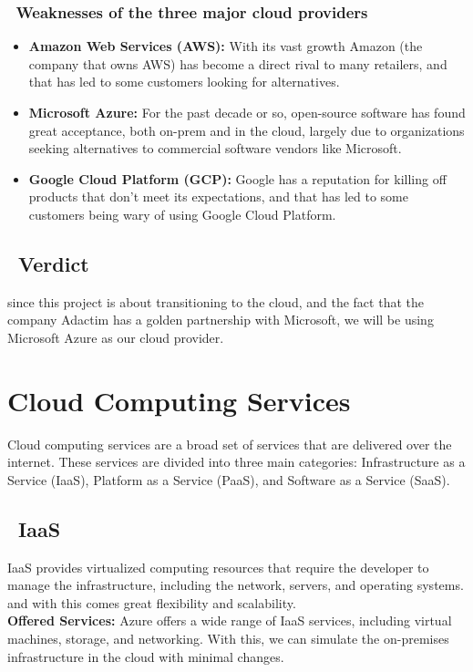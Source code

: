 \subsubsection*{ \textbullet\ Weaknesses of the three major cloud providers \cite{webArticle1}}
\begin{itemize}
    \item \textbf{Amazon Web Services (AWS):} With its vast growth Amazon (the company that owns AWS) has become a direct rival to many retailers, and that has led to some customers looking for alternatives.
    \item \textbf{Microsoft Azure:} For the past decade or so, open-source software has found great acceptance, both on-prem and in the cloud, largely due to organizations seeking alternatives to commercial software vendors like Microsoft.
    \item \textbf{Google Cloud Platform (GCP):} Google has a reputation for killing off products that don't meet its expectations, and that has led to some customers being wary of using Google Cloud Platform.
\end{itemize}
\subsection*{ \textbullet\ Verdict}
since this project is about transitioning to the cloud, and the fact that the company Adactim has a golden partnership with Microsoft, we will be using Microsoft Azure as our cloud provider.

\section{Cloud Computing Services}
Cloud computing services are a broad set of services that are delivered over the internet. These services are divided into three main categories: Infrastructure as a Service (IaaS), Platform as a Service (PaaS), and Software as a Service (SaaS).
\subsection*{ \textbullet\ IaaS}
\noindent
IaaS provides virtualized computing resources that require the developer to manage the infrastructure, including the network, servers, and operating systems. and with this comes great flexibility and scalability.
\noindent \\
\textbf{Offered Services:} Azure offers a wide range of IaaS services, including virtual machines, storage, and networking. With this, we can simulate the on-premises infrastructure in the cloud with minimal changes.
